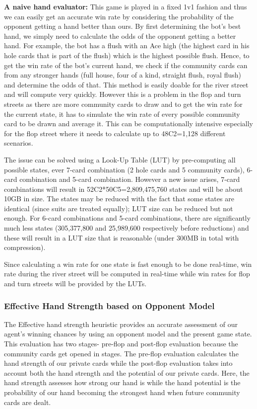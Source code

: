 \documentclass{article}
\begin{document}
\textbf{A naive hand evaluator:} This game is played in a fixed 1v1 fashion and thus we can easily get an accurate win rate by considering the probability of the opponent getting a hand better than ours. By first determining the bot’s best hand, we simply need to calculate the odds of the opponent getting a better hand. For example, the bot has a flush with an Ace high (the highest card in his hole cards that is part of the flush) which is the highest possible flush. Hence, to get the win rate of the bot’s current hand, we check if the community cards can from any stronger hands (full house, four of a kind, straight flush, royal flush) and determine the odds of that.
This method is easily doable for the river street and will compute very quickly. However this is a problem in the flop and turn streets as there are more community cards to draw and to get the win rate for the current state, it has to simulate the win rate of every possible community card to be drawn and average it. This can be computationally intensive especially for the flop street where it needs to calculate up to 48C2=1,128 different scenarios.

The issue can be solved using a Look-Up Table (LUT) by pre-computing all possible states, ever 7-card combination (2 hole cards and 5 community cards), 6-card combination and 5-card combination. However a new issue arises, 7-card combinations will result in 52C2*50C5=2,809,475,760 states and will be about 10GB in size. The states may be reduced with the fact that some states are identical (since suits are treated equally); LUT size can be reduced but not enough. For 6-card combinations and 5-card combinations, there are significantly much less states (305,377,800 and 25,989,600 respectively before reductions) and these will result in a LUT size that is reasonable (under 300MB in total with compression).

Since calculating a win rate for one state is fast enough to be done real-time, win rate during the river street will be computed in real-time while win rates for flop and turn streets will be provided by the LUTs.

\subsubsection{Effective Hand Strength based on Opponent Model}

The Effective hand strength heuristic provides an accurate assessment of our agent’s winning chances by using an opponent model and the present game state. This evaluation has two stages- pre-flop and post-flop evaluation because the community cards get opened in stages. The pre-flop evaluation calculates the hand strength of our private cards while the post-flop evaluation takes into account both the hand strength and the potential of our private cards. Here, the hand strength assesses how strong our hand is while the hand potential is the probability of our hand becoming the strongest hand when future community cards are dealt. 
\end{document}
